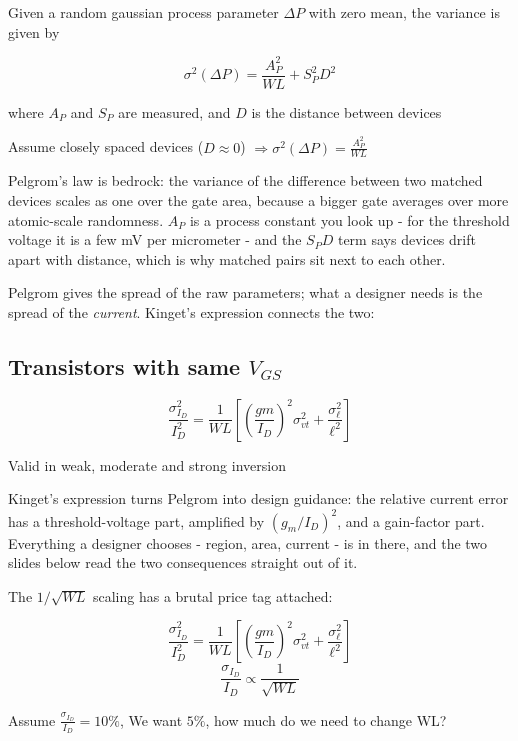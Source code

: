 Given a random gaussian process parameter \(\Delta P\) with zero mean,
the variance is given by

\[\sigma^2 (\Delta P) = \frac{A^2_P}{WL} + S_{P}^2 D^2\]

where \(A_P\) and \(S_P\) are measured, and \(D\) is the distance
between devices

Assume closely spaced devices (\(D \approx 0\))
\(\Rightarrow \sigma^2 (\Delta P) = \frac{A^2_P}{WL}\)

Pelgrom's law is bedrock: the variance of the difference between two
matched devices scales as one over the gate area, because a bigger gate
averages over more atomic-scale randomness. \(A_P\) is a process
constant you look up - for the threshold voltage it is a few mV per
micrometer - and the \(S_P D\) term says devices drift apart with
distance, which is why matched pairs sit next to each other.

Pelgrom gives the spread of the raw parameters; what a designer needs is
the spread of the \emph{current}. Kinget's expression
 connects the two:

\subsection{\texorpdfstring{Transistors with same \(V_{GS}\)
}{Transistors with same V\_\{GS\} {[}3{]}}}\label{transistors-with-same-v_gs-kinget05}

\[\frac{\sigma_{I_D}^2}{I_D^2} = \frac{1}{WL}\left[\left(\frac{gm}{I_D}\right)^2 \sigma_{vt}^2 + \frac{\sigma_{\ell}^2}{\ell^2}\right] \]

Valid in weak, moderate and strong inversion

Kinget's expression turns Pelgrom into design guidance: the relative
current error has a threshold-voltage part, amplified by
\((g_m/I_D)^2\), and a gain-factor part. Everything a designer chooses -
region, area, current - is in there, and the two slides below read the
two consequences straight out of it.

The \(1/\sqrt{WL}\) scaling has a brutal price tag attached:

\[\frac{\sigma_{I_D}^2}{I_D^2} = \frac{1}{WL}\left[\left(\frac{gm}{I_D}\right)^2 \sigma_{vt}^2 + \frac{\sigma_{\ell}^2}{\ell^2}\right] \]
\[\frac{\sigma_{I_D}}{I_D} \propto \frac{1}{\sqrt{WL}}\]

Assume \(\frac{\sigma_{I_D}}{I_D} = 10\%\), We want \(5\%\), how much do
we need to change WL?

